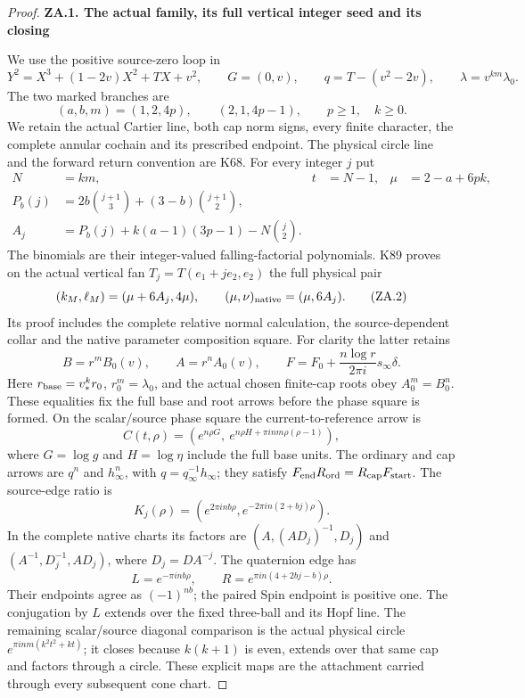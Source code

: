 \begin{proof}
\par

\medskip\noindent\textbf{ZA.1. The actual family, its full vertical integer seed and its closing}

\par\nopagebreak[4]

We use the positive source-zero loop in
\[
Y^2=X^3+(1-2v)X^2+TX+v^2,\qquad G=(0,v),\qquad
q=T-(v^2-2v),\qquad\lambda=v^{km}\lambda_0.
\]
The two marked branches are
\[
(a,b,m)=(1,2,4p),\qquad(2,1,4p-1),\qquad
p\ge1,\quad k\ge0.
\]
We retain the actual Cartier line, both cap norm signs, every finite
character, the complete annular cochain and its prescribed endpoint.
The physical circle line and the forward return convention are K68.
For every integer \(j\) put
\[
\begin{aligned}
N&=km,& t&=N-1,& \mu&=2-a+6pk,\\
P_b(j)&=2b\binom{j+1}{3}+(3-b)\binom{j+1}{2},\\
A_j&=P_b(j)+k(a-1)(3p-1)-N\binom j2.
\end{aligned}                                           \tag{ZA.1}
\]
The binomials are their integer-valued falling-factorial polynomials.
K89 proves on the actual vertical fan
\(T_j=T(e_1+je_2,e_2)\) the full physical pair
\[
(k_M,\ell_M)=(\mu+6A_j,4\mu),
\qquad(\mu,\nu)_{\rm native}=(\mu,6A_j).                \tag{ZA.2}
\]
Its proof includes the complete relative normal calculation, the
source-dependent collar and the native parameter composition square.
For clarity the latter retains
\[
B=r^mB_0(v),\qquad A=r^nA_0(v),\qquad
F=F_0+\frac{n\log r}{2\pi i}s_\infty\delta.
\]
Here \(r_{\rm base}=v_*^k r_0\), \(r_0^m=\lambda_0\), and the
actual chosen finite-cap roots obey \(A_0^m=B_0^n\). These
equalities fix the full base and root arrows before the phase square
is formed.
On the scalar/source phase square the current-to-reference arrow is
\[
C(t,\rho)=\left(
e^{n\rho G},\ e^{n\rho H+\pi i nm\rho(\rho-1)}
\right),                                               \tag{ZA.3}
\]
where \(G=\log g\) and \(H=\log\eta\) include the full base units.
The ordinary and cap arrows are \(q^n\) and \(h_\infty^n\), with
\(q=q_\infty^{-1}h_\infty\); they satisfy
\(F_{\rm end}R_{\rm ord}=R_{\rm cap}F_{\rm start}\).
The source-edge ratio is
\[
K_j(\rho)=\left(e^{2\pi inb\rho},
e^{-2\pi in(2+bj)\rho}\right).
\]
In the complete native charts its factors are
\((A,(AD_j)^{-1},D_j)\) and
\((A^{-1},D_j^{-1},AD_j)\), where \(D_j=DA^{-j}\).
The quaternion edge has
\[
L=e^{-\pi inb\rho},\qquad
R=e^{\pi in(4+2bj-b)\rho}.
\]
Their endpoints agree as \((-1)^{nb}\); the paired Spin endpoint
is positive one. The conjugation by \(L\) extends over the fixed
three-ball and its Hopf line. The remaining scalar/source diagonal
comparison is the actual physical circle
\(e^{\pi inm(k^2t^2+kt)}\); it closes because \(k(k+1)\) is even,
extends over that same cap and factors through a circle. These explicit
maps are the attachment carried through every subsequent cone chart.


\end{proof}
